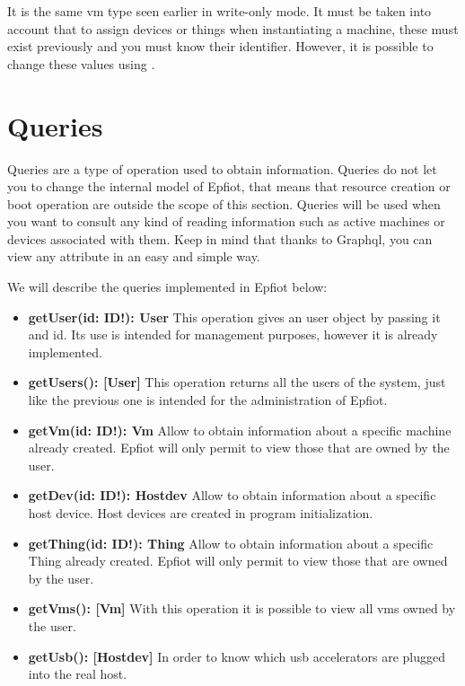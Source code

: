 It is the same vm type seen earlier in write-only mode. It must be taken into account that to assign devices or things when instantiating a machine, these must exist previously and you must know their identifier. However, it is possible to change these values using .

\newpage


\section{Queries}
\label{makereference5.2}

Queries are a type of operation used to obtain information. Queries do not let you to change the internal model of Epfiot, that means that resource creation or boot operation are outside the scope of this section.
Queries will be used when you want to consult any kind of reading information such as active machines or devices associated with them. Keep in mind that thanks to Graphql, you can view any attribute in an easy and simple way.

We will describe the queries implemented in Epfiot below:


\begin{itemize}
    \item \textbf{getUser(id: ID!): User}\hfill\break
    This operation gives an user object by passing it and id. Its use is intended for management purposes, however it is already implemented.
    \item \textbf{getUsers(): [User]}\hfill\break
    This operation returns all the users of the system, just like the previous one is intended for the administration of Epfiot.
    \item \textbf{getVm(id: ID!): Vm}\hfill\break
    Allow to obtain information about a specific machine already created. Epfiot will only permit to view those that are owned by the user.
    \item \textbf{getDev(id: ID!): Hostdev}\hfill\break
    Allow to obtain information about a specific host device. Host devices are created in program initialization.
    \item \textbf{getThing(id: ID!): Thing}\hfill\break
    Allow to obtain information about a specific Thing already created. Epfiot will only permit to view those that are owned by the user.
    \item \textbf{getVms(): [Vm]}\hfill\break
    With this operation it is possible to view all vms owned by the user.
    \item \textbf{getUsb(): [Hostdev]}\hfill\break
    In order to know which usb accelerators are plugged into the real host.
\end{itemize}


